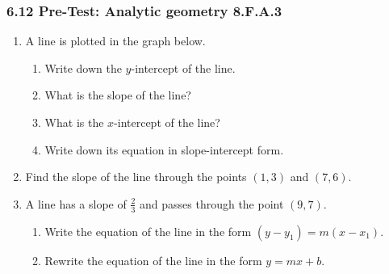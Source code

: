 

\fancyhead[LE]{\thepage}



\subsubsection*{6.12 Pre-Test: Analytic geometry \hfill 8.F.A.3}
\begin{enumerate}

\item A line is plotted in the graph below.
\begin{multicols}{2}
    \begin{enumerate}[itemsep=0.5cm]
      \item Write down the $y$-intercept of the line.
      \item What is the slope of the line?
      \item What is the $x$-intercept of the line?
      \item Write down its equation in slope-intercept form.
      \end{enumerate}
    \begin{flushright}
    \end{flushright}
  \end{multicols} \vspace{2cm}

\item Find the slope of the line through the points $(1, 3)$ and $(7, 6)$. \vspace{3cm}

\item A line has a slope of $\displaystyle \frac{2}{3}$ and passes through the point $(9, 7)$. 
  \begin{enumerate}[itemsep=1cm]
      \item Write the equation of the line in the form $(y-y_1)=m(x-x_1)$.
      \item Rewrite the equation of the line in the form $y=mx+b$. \vspace{4cm}
  \end{enumerate}


\end{enumerate}
